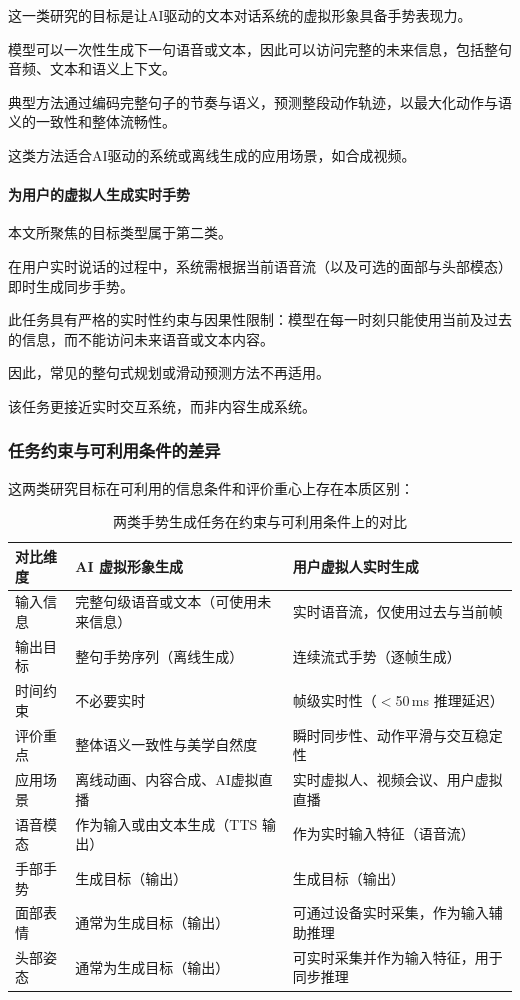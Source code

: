 这一类研究的目标是让AI驱动的文本对话系统的虚拟形象具备手势表现力。

模型可以一次性生成下一句语音或文本，因此可以访问完整的未来信息，包括整句音频、文本和语义上下文。

典型方法通过编码完整句子的节奏与语义，预测整段动作轨迹，以最大化动作与语义的一致性和整体流畅性。

这类方法适合AI驱动的系统或离线生成的应用场景，如合成视频。

\paragraph{为用户的虚拟人生成实时手势}
本文所聚焦的目标类型属于第二类。

在用户实时说话的过程中，系统需根据当前语音流（以及可选的面部与头部模态）即时生成同步手势。

此任务具有严格的实时性约束与因果性限制：模型在每一时刻只能使用当前及过去的信息，而不能访问未来语音或文本内容。

因此，常见的整句式规划或滑动预测方法不再适用。

该任务更接近实时交互系统，而非内容生成系统。

\subsubsection{任务约束与可利用条件的差异}

这两类研究目标在可利用的信息条件和评价重心上存在本质区别：

\begin{table}[h]
\centering
\caption{两类手势生成任务在约束与可利用条件上的对比}
\label{tab:task_constraint_comparison}
\begin{tabular}{@{}p{3cm}p{5.5cm}p{5.5cm}@{}}
\toprule
\textbf{对比维度} & \textbf{AI 虚拟形象生成} & \textbf{用户虚拟人实时生成} \\ 
\midrule
输入信息 & 完整句级语音或文本（可使用未来信息） & 实时语音流，仅使用过去与当前帧 \\ 
输出目标 & 整句手势序列（离线生成） & 连续流式手势（逐帧生成） \\ 
时间约束 & 不必要实时 & 帧级实时性（$<$50\,ms 推理延迟） \\ 
评价重点 & 整体语义一致性与美学自然度 & 瞬时同步性、动作平滑与交互稳定性 \\ 
应用场景 & 离线动画、内容合成、AI虚拟直播 & 实时虚拟人、视频会议、用户虚拟直播 \\ 
\midrule
语音模态 & 作为输入或由文本生成（TTS 输出） & 作为实时输入特征（语音流） \\ 
手部手势 & 生成目标（输出） & 生成目标（输出） \\ 
面部表情 & 通常为生成目标（输出） & 可通过设备实时采集，作为输入辅助推理 \\ 
头部姿态 & 通常为生成目标（输出） & 可实时采集并作为输入特征，用于同步推理 \\ 
\bottomrule
\end{tabular}
\end{table}

